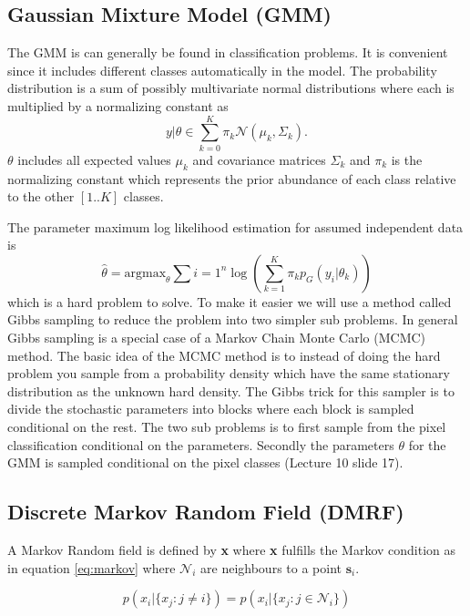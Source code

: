 \documentclass[a4paper,english]{article}
\begin{document}
\subsection{Gaussian Mixture Model (GMM)}
The GMM is can generally be found in classification problems.
It is convenient since it includes different classes automatically in the model.
The probability distribution is a sum of possibly multivariate normal distributions where each is multiplied by a normalizing constant as
\begin{equation}
  y | \theta \in \sum_{k = 0}^K \pi_k \mathcal{N}(\mu_k, \Sigma_k).
  \label{eq:gmm}
\end{equation}
$\theta$ includes all expected values $\mu_k$ and covariance matrices $\Sigma_k$ and $\pi_k$ is the normalizing constant which represents the prior abundance of each class relative to the other $[1..K]$ classes.

The parameter maximum log likelihood estimation for assumed independent data is
\begin{equation}
  \hat{\theta} = \text{argmax}_{\theta} \sum{i = 1}^n \log \left(  \sum_{k=1}^K \pi_k p_G(y_i | \theta_k) \right)
\end{equation}
which is a hard problem to solve.
To make it easier we will use a method called Gibbs sampling to reduce the problem into two simpler sub problems.
In general Gibbs sampling is a special case of a Markov Chain Monte Carlo (MCMC) method.
The basic idea of the MCMC method is to instead of doing the hard problem you sample from a probability density which have the same stationary distribution as the unknown hard density.
The Gibbs trick for this sampler is to divide the stochastic parameters into blocks where each block is sampled conditional on the rest.
The two sub problems is to first sample from the pixel classification conditional on the parameters.
Secondly the parameters $\theta$ for the GMM is sampled conditional on the pixel classes (Lecture 10 slide 17\cite{L10}).

\subsection{Discrete Markov Random Field (DMRF)}

A Markov Random field is defined by \textbf{x} where \textbf{x} fulfills the Markov condition as in equation \ref{eq:markov} where $\mathcal{N}_i$ are neighbours to a point $\textbf{s}_i$.

\begin{equation}
	p(x_i|\{x_j : j\neq i\}) = p(x_i|\{x_j : j\in \mathcal{N}_i\})
	\label{eq:markov}
\end{equation}
\end{document}

